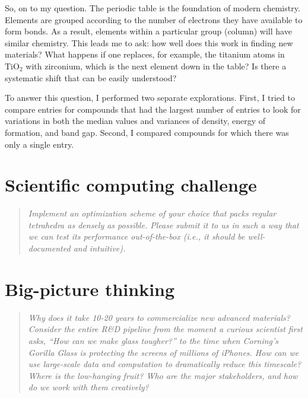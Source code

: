 \documentclass{article}
\begin{document}
So, on to my question. The periodic table is the foundation of modern chemistry. Elements are grouped according to the number of electrons they have available to form bonds. As a result, elements within a particular group (column) will have similar chemistry.  This leads me to ask: how well does this work in finding new materials?  What happens if one replaces, for example, the titanium atoms in  $\mathrm{TiO_2}$ with zirconium, which is the next element down in the table? Is there a systematic shift that can be easily understood?

To answer this question, I performed two separate explorations. First, I tried to compare entries for compounds that had the largest number of entries to look for variations in both the median values and variances of density, energy of formation, and band gap.  Second, I compared compounds for which there was only a single entry.

\section{Scientific computing challenge}
\begin{quote} \sl
Implement an optimization scheme of your choice that packs regular tetrahedra as densely as possible. Please submit it to us in such a way that we can test its performance out-of-the-box (i.e., it should be well-documented and intuitive).
\end{quote}

\section{Big-picture thinking}
\begin{quote} \sl
Why does it take 10-20 years to commercialize new advanced materials? Consider the entire R\&D pipeline from the moment a curious scientist first asks, ``How can we make glass tougher?'' to the time when Corning's Gorilla Glass is protecting the screens of millions of iPhones. How can we use large-scale data and computation to dramatically reduce this timescale? Where is the low-hanging fruit? Who are the major stakeholders, and how do we work with them creatively?
\end{quote}
\end{document}
